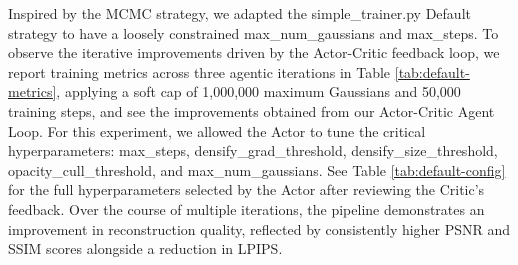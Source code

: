 \noindent Inspired by the MCMC strategy, we adapted the simple\_trainer.py Default strategy to have a loosely constrained max\_num\_gaussians and max\_steps. To observe the iterative improvements driven by the Actor-Critic feedback loop, we report training metrics across three agentic iterations in Table \ref{tab:default-metrics}, applying a soft cap of 1,000,000 maximum Gaussians and 50,000 training steps, and see the improvements obtained from our Actor-Critic Agent Loop. For this experiment, we allowed the Actor to tune the critical hyperparameters: max\_steps,  densify\_grad\_threshold, densify\_size\_threshold, opacity\_cull\_threshold, and max\_num\_gaussians. See Table \ref{tab:default-config} for the full hyperparameters selected by the Actor after reviewing the Critic’s feedback. Over the course of multiple iterations, the pipeline demonstrates an improvement in reconstruction quality, reflected by consistently higher PSNR and SSIM scores alongside a reduction in LPIPS. \\


\begin{table}[h!]
\centering
\caption{Edited Default Training Metrics per Agentic Loop}
\label{tab:default-metrics}
\end{table}
 
\begin{table}[h!]
\centering
\caption{Edited Default Training Configurations per Agentic Loop}
\label{tab:default-config}
\end{table}

